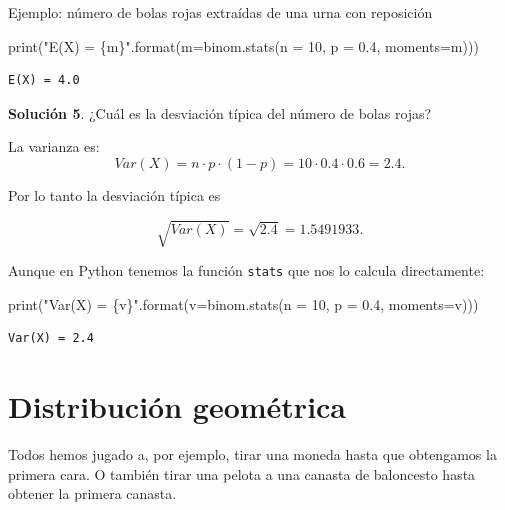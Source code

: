 \documentclass[
  letterpaper,
  DIV=11,
  numbers=noendperiod]{scrreprt}
\newenvironment{Shaded}{\begin{snugshade}}{\end{snugshade}}
\newcommand{\BuiltInTok}[1]{\textcolor[rgb]{0.00,0.23,0.31}{#1}}
\newcommand{\DecValTok}[1]{\textcolor[rgb]{0.68,0.00,0.00}{#1}}
\newcommand{\FloatTok}[1]{\textcolor[rgb]{0.68,0.00,0.00}{#1}}
\newcommand{\NormalTok}[1]{\textcolor[rgb]{0.00,0.23,0.31}{#1}}
\newcommand{\OperatorTok}[1]{\textcolor[rgb]{0.37,0.37,0.37}{#1}}
\newcommand{\SpecialCharTok}[1]{\textcolor[rgb]{0.37,0.37,0.37}{#1}}
\newcommand{\StringTok}[1]{\textcolor[rgb]{0.13,0.47,0.30}{#1}}
\begin{document}
\begin{Ejemplo}{Ejemplo: número de bolas rojas extraídas de una urna con reposición}{}
\begin{Shaded}
\begin{Highlighting}[]
\BuiltInTok{print}\NormalTok{(}\StringTok{"E(X) = }\SpecialCharTok{\{m\}}\StringTok{"}\NormalTok{.}\BuiltInTok{format}\NormalTok{(m}\OperatorTok{=}\NormalTok{binom.stats(n }\OperatorTok{=} \DecValTok{10}\NormalTok{, p }\OperatorTok{=} \FloatTok{0.4}\NormalTok{, moments}\OperatorTok{=}\StringTok{\textquotesingle{}m\textquotesingle{}}\NormalTok{)))}
\end{Highlighting}
\end{Shaded}

\begin{verbatim}
E(X) = 4.0
\end{verbatim}

\textbf{Solución 5}. ¿Cuál es la desviación típica del número de bolas
rojas?

La varianza es: \[
Var(X)=n\cdot p \cdot(1-p)=10\cdot 0.4\cdot 0.6=2.4.
\]

Por lo tanto la desviación típica es

\[\sqrt{Var(X)}=\sqrt{2.4}= 1.5491933.\]

Aunque en Python tenemos la función \texttt{stats} que nos lo calcula
directamente:

\begin{Shaded}
\begin{Highlighting}[]
\BuiltInTok{print}\NormalTok{(}\StringTok{"Var(X) = }\SpecialCharTok{\{v\}}\StringTok{"}\NormalTok{.}\BuiltInTok{format}\NormalTok{(v}\OperatorTok{=}\NormalTok{binom.stats(n }\OperatorTok{=} \DecValTok{10}\NormalTok{, p }\OperatorTok{=} \FloatTok{0.4}\NormalTok{, moments}\OperatorTok{=}\StringTok{\textquotesingle{}v\textquotesingle{}}\NormalTok{)))}
\end{Highlighting}
\end{Shaded}

\begin{verbatim}
Var(X) = 2.4
\end{verbatim}

\end{Ejemplo}

\section{Distribución geométrica}\label{distribuciuxf3n-geomuxe9trica}

Todos hemos jugado a, por ejemplo, tirar una moneda hasta que obtengamos
la primera cara. O también tirar una pelota a una canasta de baloncesto
hasta obtener la primera canasta.
\end{document}

